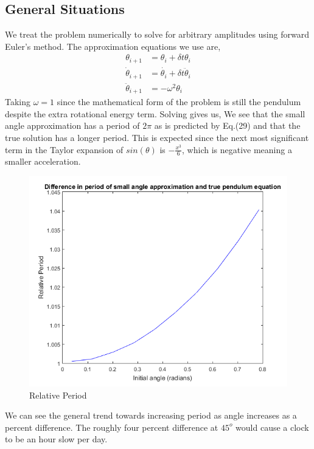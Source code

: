 \documentclass[%
 reprint,
 amsmath,amssymb,
 aps,
]{revtex4-1}
\begin{document}
\subsection{General Situations}
We treat the problem numerically to solve for arbitrary amplitudes using forward Euler's method.
The approximation equations we use are,
\begin{equation}
\begin{aligned}
	\theta_{i+1}& = \theta_{i} + \delta t \theta_{i}\\
	\dot{\theta}_{i+1}& = \dot{\theta_{i}} + \delta t \ddot{\theta}_{i}\\
	\ddot{\theta}_{i+1}& = - \omega^2 \theta_{i}
\end{aligned}
\end{equation}
Taking $\omega = 1$ since the mathematical form of the problem is still the pendulum despite the extra rotational energy term.
Solving gives us, We see that the small angle approximation has a period of $2\pi$ as is predicted by Eq.(29) and that the true solution has a longer period. This is expected since the next most significant term in the Taylor expansion of $sin(\theta)$ is $-\frac{x^3}{6}$, which is negative meaning a smaller acceleration. 
\begin{figure}[h!]
	\centering
	\includegraphics[scale=0.5]{Pendulum-relativeperiod.png}
	\caption{Relative Period}
	\label{fig3}
\end{figure}

We can see the general trend towards increasing period as angle increases as a percent difference. The roughly four percent difference at $45^o$ would cause a clock to be an hour slow per day.
\end{document}
